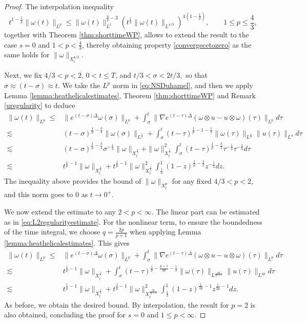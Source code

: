 \documentclass[11pt,a4paper]{article}
\newcommand{\w}{\omega}
\newcommand{\na}{\nabla}
\newcommand{\norm}[1]{\|#1\|}
\def\heat#1{e^{#1 \Delta}}
\begin{document}
\begin{proof}
The interpolation inequality
$$
t^{1-\frac{1}{p}}\|\omega(t)\|_{L^p}
\leq
\|\omega(t)\|_{L^1}^{\frac{4}{p}-3}
(t^{\frac14}\|\omega(t)\|_{L^{4/3}})^{4(1-\frac{1}{p})},
\qquad 1\leq p\leq \frac{4}{3},
$$
together with Theorem \ref{thm:shorttimeWP}, allows to extend the result to the case $s=0$ and $1<p<\frac{4}{3}$, thereby obtaining property \eqref{convergecetozero} as the same holds for $\norm{\w}_{X_t^{4/3}}$.

Next, we fix $4/3<p<2$, $0<t\leq T$, and $t/3<\sigma<2t/3,$ so that $\sigma\approx (t-\sigma)\approx t$. We take the $L^p$ norm in \eqref{eq:NSDuhamel}, and then we apply Lemma \ref{lemma:heathelicalestimates}, Theorem \ref{thm:shorttimeWP} and Remark \ref{uregularity} to deduce
\begin{equation}\label{eq:L2regularityestimate}
\begin{aligned}
\|\w(t)\|_{L^p}\leq& \|\heat{(t-\sigma)}\w(\sigma)\|_{L^p}+\int_\sigma^t\|\na\heat{(t-\tau)}(\w\otimes u-u\otimes \w)(\tau)\|_{L^p}d\tau\\
\lesssim & (t-\sigma)^{\frac{1}{p}-\frac{3}{4}}\|\omega(\sigma)\|_{L^{\frac{4}{3}}}+\int_\sigma^t (t-\tau)^{\frac{1}{p}-{1}-\frac{1}{2}}\|\w(\tau)\|_{L^\frac{4}{3}}\|u(\tau)\|_{L^4}d\tau \\
\lesssim & (t-\sigma)^{\frac{1}{p}-\frac{3}{4}}\sigma^{-\frac{1}{4}}\|\omega\|_{X_t^{\frac{4}{3}}}+\|\omega\|^2_{X_t^{\frac{4}{3}}}\int_\sigma^t (t-\tau)^{\frac{1}{p}-\frac{3}{2}}\tau^{-\frac{1}{4}}\tau^{-\frac{1}{4}}d\tau\\
\lesssim & t^{\frac{1}{p}-1}\|\omega\|_{X_t^{\frac{4}{3}}}+ t^{\frac{1}{p}-1}\|\omega\|^2_{X_t^{\frac{4}{3}}}\int_{\frac{1}{3}}^1 (1-z)^{\frac{1}{p}-\frac{3}{2}}z^{-\frac{1}{2}}dz.
\end{aligned}
\end{equation}
The inequality above provides the bound of $\norm{\w}_{X_t^p}$ for any fixed $4/3<p<2$, and this norm goes to 0 as $t\to0^+$.

We now extend the estimate to any $2<p<\infty$.
The linear part can be estimated as in \eqref{eq:L2regularityestimate}. For the nonlinear term, to ensure the boundedness of the time integral, we choose $q=\frac{2p}{p+1}$ when applying Lemma \ref{lemma:heathelicalestimates}. This gives
$$
\begin{aligned}
\|\w(t)\|_{L^p}\leq& \|\heat{(t-\sigma)}\w(\sigma)\|_{L^p}+\int_\sigma^t\|\na\heat{(t-\tau)}(\w\otimes u-u\otimes \w)(\tau)\|_{L^p}d\tau\\
\lesssim & t^{\frac{1}{p}-1}\|\omega\|_{X_t^{\frac{4}{3}}}+\int_\sigma^t (t-\tau)^{\frac{1}{p}-\frac{p+1}{2p}-\frac{1}{2}}\|\w(\tau)\|_{L^\frac{4p}{2p+1}}\|u(\tau)\|_{L^{4p}}d\tau\\
\lesssim & t^{\frac{1}{p}-1}\|\omega\|_{X_t^{\frac{4}{3}}}+ t^{\frac{1}{p}-1}\|\w\|^2_{X_t^\frac{4p}{2p+1}}\int_{\frac{1}{3}}^1 (1-z)^{\frac1{2p}-1}z^{\frac{1}{2p}-1}dz.
\end{aligned}$$
As before, we obtain the desired bound.
By interpolation, the result for $p=2$ is also obtained, concluding the proof for $s=0$ and $1\leq p<\infty.$


\end{proof}
\end{document}
